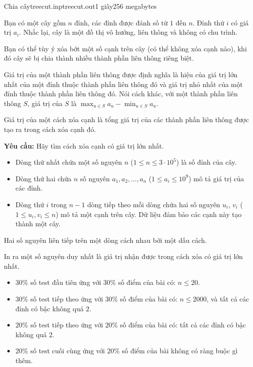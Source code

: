 \begin{problem}{Chia cây}{treecut.inp}{treecut.out}{1 giây}{256 megabytes}
 
 
Bạn có một cây gồm $n$ đỉnh, các đỉnh được đánh số từ $1$ đến $n$. Đỉnh thứ $i$ có giá trị $a_i$. Nhắc lại, cây là một đồ thị vô hướng, liên thông và không có chu trình. 

Bạn có thể tùy ý xóa bớt một số cạnh trên cây (có thể không xóa cạnh nào), khi đó cây sẽ bị chia thành nhiều thành phần liên thông riêng biệt. 

Giá trị của một thành phần liên thông được định nghĩa là hiệu của giá trị lớn nhất của một đỉnh thuộc thành phần liên thông đó và giá trị nhỏ nhất của một đỉnh thuộc thành phần liên thông đó. Nói cách khác, với một thành phần liên thông $S$, giá trị của $S$ là $\max_{u \in S}a_u - \min_{u \in S}a_u$.

Giá trị của một cách xóa cạnh là tổng giá trị của các thành phần liên thông được tạo ra trong cách xóa cạnh đó.

\textbf{Yêu cầu:} Hãy tìm cách xóa cạnh có giá trị lớn nhất.
 
\InputFile
\begin{itemize}
\item Dòng thứ nhất chứa một số nguyên $n$ ($1 \le n \le 3 \cdot 10^5$) là số đỉnh của cây.
\item Dòng thứ hai chứa $n$ số nguyên $a_1, a_2, \dots, a_n$ ($1 \le a_i \le 10^9$) mô tả giá trị của các đỉnh.
\item Dòng thứ $i$ trong $n - 1$ dòng tiếp theo mỗi dòng chứa hai số nguyên $u_i$, $v_i$ ($1 \le u_i, v_i \le n$) mô tả một cạnh trên cây. Dữ liệu đảm bảo các cạnh này tạo thành một cây.
\end{itemize}

Hai số nguyên liên tiếp trên một dòng cách nhau bởi một dấu cách.
 
\OutputFile
In ra một số nguyên duy nhất là giá trị nhận được trong cách xóa có giá trị lớn nhất.
 
\Scoring
\begin{itemize}
\item $30\%$ số test đầu tiên ứng với $30\%$ số điểm của bài có: $n \le 20$.
\item $30\%$ số test tiếp theo ứng với $30\%$ số điểm của bài có: $n \le 2000$, và tất cả các đỉnh có bậc không quá $2$.
\item $20\%$ số test tiếp theo ứng với $20\%$ số điểm của bài có: tất cả các đỉnh có bậc không quá $2$.
\item $20\%$ số test cuối cùng ứng với $20\%$ số điểm của bài không có ràng buộc gì thêm.
\end{itemize}
 

\end{problem}
